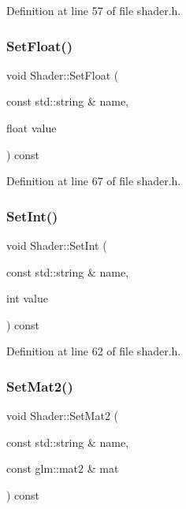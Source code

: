 Definition at line 57 of file shader.\+h.

\mbox{\label{class_shader_ac20ee02a436e4baeb63dde08a0364574}} 
\subsubsection{\texorpdfstring{SetFloat()}{SetFloat()}}
{\footnotesize\ttfamily void Shader\+::\+Set\+Float (\begin{DoxyParamCaption}\item[{const std\+::string \&}]{name,  }\item[{float}]{value }\end{DoxyParamCaption}) const\hspace{0.3cm}{\ttfamily [inline]}}



Definition at line 67 of file shader.\+h.

\mbox{\label{class_shader_a645ef3753b1fc09a30dbb26f817d88e5}} 
\subsubsection{\texorpdfstring{SetInt()}{SetInt()}}
{\footnotesize\ttfamily void Shader\+::\+Set\+Int (\begin{DoxyParamCaption}\item[{const std\+::string \&}]{name,  }\item[{int}]{value }\end{DoxyParamCaption}) const\hspace{0.3cm}{\ttfamily [inline]}}



Definition at line 62 of file shader.\+h.

\mbox{\label{class_shader_ac345337847ed1014b53f5fa8f0d36f92}} 
\subsubsection{\texorpdfstring{SetMat2()}{SetMat2()}}
{\footnotesize\ttfamily void Shader\+::\+Set\+Mat2 (\begin{DoxyParamCaption}\item[{const std\+::string \&}]{name,  }\item[{const glm\+::mat2 \&}]{mat }\end{DoxyParamCaption}) const\hspace{0.3cm}{\ttfamily [inline]}}



